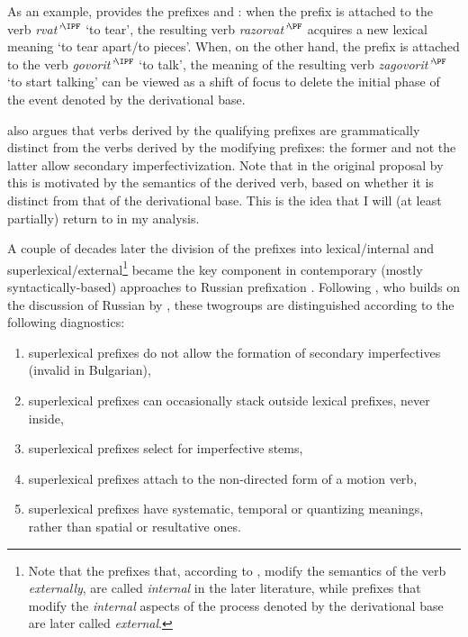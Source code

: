 As an example, \citet{Isachenko:60} provides the prefixes  and : when the prefix  is attached to the verb \textit{rvat'}$^{\IPF}$ `to tear', the resulting verb \textit{razorvat'}$^{\PF}$ acquires a new lexical meaning `to tear apart/to pieces'. When, on the other hand, the prefix  is attached to the verb \textit{govorit'}$^{\IPF}$ `to talk', the meaning of the resulting verb \textit{zagovorit'}$^{\PF}$ `to start talking' can be viewed as a shift of focus to delete the initial phase of the event denoted by the derivational base.

\citet{Isachenko:60} also argues that verbs derived by the qualifying prefixes are grammatically distinct from the verbs derived by the modifying prefixes: the former and not the latter allow secondary imperfectivization. Note that in the original proposal by \citet{Isachenko:60} this is motivated by the semantics of the derived verb, based on whether it is distinct from that of the derivational base. This is the idea that I will (at least partially) return to in my analysis.

A couple of decades later the division of the prefixes into lexical\slash internal and superlexical\slash external\footnote{Note that the prefixes that, according to \citet{Isachenko:60}, modify the semantics of the verb \textit{externally}, are called \textit{internal} in the later literature, while prefixes that modify the \textit{internal} aspects of the process denoted by the derivational base are later called \textit{external}.} became the key component in contemporary (mostly syn\-tac\-tically-based) approaches to Russian prefixation \citep{Schoorlemmer:95, Babko-Malaya:99, Borik:02, Gehrke:04, Ramchand:04, Romanova:04, Romanova:06, Svenonius:04a, Svenonius:04b, DiSciullo:05}. Following \citet[229]{Svenonius:04b}, who builds on the discussion of Russian by \citet{Schoorlemmer:95}, these two\linebreak groups are distinguished according to the following diagnostics:

\begin{enumerate}
\item superlexical prefixes do not allow the formation of secondary imperfectives (invalid in Bulgarian), 
\item superlexical prefixes can occasionally stack outside lexical prefixes, never inside, 
\item superlexical prefixes select for imperfective stems, 
\item superlexical prefixes attach to the non-directed form of a motion verb,
\item superlexical prefixes have systematic, temporal or quantizing meanings, rather than spatial or resultative ones.
\end{enumerate}

